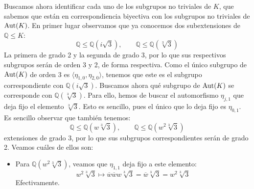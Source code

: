 \begin{ejercicio}
\begin{enumerate}
\begin{figure}[H]
            \end{figure}
            Buscamos ahora identificar cada uno de los subgrupos no triviales de $K$, que sabemos que están en correspondiencia biyectiva con los subgrupos no triviales de $\operatorname{Aut}(K)$. En primer lugar observamos que ya conocemos dos subextensiones de $\mathbb{Q}\leq K$:
            \begin{equation*}
                \mathbb{Q}\leq\mathbb{Q}\left(i\sqrt{3}\right), \qquad \mathbb{Q}\leq\mathbb{Q}\left(\sqrt[3]{3}\right)
            \end{equation*}
            La primera de grado 2 y la segunda de grado 3, por lo que sus respectivos subgrupos serán de orden 3 y 2, de forma respectiva. Como el único subgrupo de $\operatorname{Aut}(K)$ de orden 3 es $\langle \eta_{1,0},\eta_{2,0} \rangle $, tenemos que este es el subgrupo correspondiente con $\mathbb{Q}\left(i\sqrt{3}\right)$. Buscamos ahora qué subgrupo de $\operatorname{Aut}(K)$ se corresponde con $\mathbb{Q}\left(\sqrt[3]{3}\right)$. Para ello, hemos de buscar el automorfismo $\eta_{j,1}$ que deja fijo el elemento $\sqrt[3]{3}$. Esto es sencillo, pues el único que lo deja fijo es $\eta_{0,1}$. Es sencillo observar que también tenemos:
            \begin{equation*}
                \mathbb{Q}\leq \mathbb{Q}\left(w\sqrt[3]{3}\right), \qquad \mathbb{Q}\leq \mathbb{Q}\left(w^2\sqrt[3]{3}\right)
            \end{equation*}
            extensiones de grado 3, por lo que sus subgrupos correspondientes serán de grado 2. Veamos cuáles de ellos son:
            \begin{itemize}
                \item Para $\mathbb{Q}\left(w^2\sqrt[3]{3}\right)$, veamos que $\eta_{1,1}$ deja fijo a este elemento:
                    \begin{equation*}
                        w^2\sqrt[3]{3} \longmapsto \overline{w}\overline{w}w\sqrt[3]{3} = \overline{w}\sqrt[3]{3} = w^2\sqrt[3]{3}
                    \end{equation*}
                    Efectivamente.

\end{itemize}
\end{enumerate}
\end{ejercicio}
